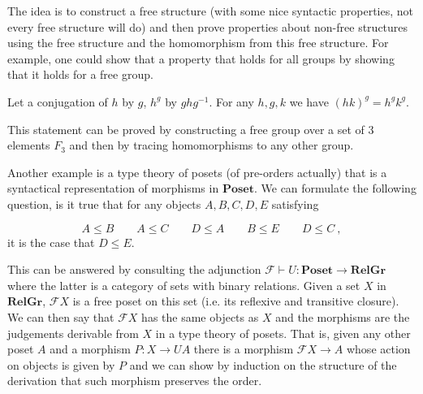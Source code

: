 \documentclass[acmsmall,screen, nonacm, anonymous]{acmart}
\begin{document}
The idea is to construct a free structure (with some nice syntactic properties, not every free structure will do) and then prove properties about non-free structures using the free structure and the homomorphism from this free structure.
For example, one could show that a property that holds for all groups by showing that it holds for a free group.

\begin{example}

Let a conjugation of $h$ by $g$, $h^{g}$ by $ghg^{-1}$.
For any $h,g,k$ we have $(hk)^{g} = h^{g}k^{g}$.

This statement can be proved by constructing a free group over a set of 3 elements $F_{3}$ and then by tracing homomorphisms to any other group.
\end{example}


\begin{example}

Another example is a type theory of posets (of pre-orders actually) that is a syntactical representation of morphisms in $\mathbf{Poset}$.
We can formulate the following question, is it true that for any objects $A,B,C,D,E$ satisfying

\[
A \leq B \qquad A \leq C \qquad D \leq A \qquad B \leq E \qquad D \leq C~,
\]
it is the case that $D \leq E$.

This can be answered by consulting the adjunction $\mathcal{F} \vdash U : \mathbf{Poset} \to \mathbf{RelGr}$ where the latter is a category of sets with binary relations.
Given a set $X$ in $\mathbf{RelGr}$, $\mathcal{F}X$ is a free poset on this set (i.e. its reflexive and transitive closure).
We can then say that $\mathcal{F}X$ has the same objects as $X$ and the morphisms are the judgements derivable from $X$ in a type theory of posets.
That is, given any other poset $A$ and a morphism $P : X \to UA$ there is a morphism $\mathcal{F}X \to A$ whose action on objects is given by $P$ and we can show by induction on the structure of the derivation that such morphism preserves the order.
\end{example}
\end{document}
